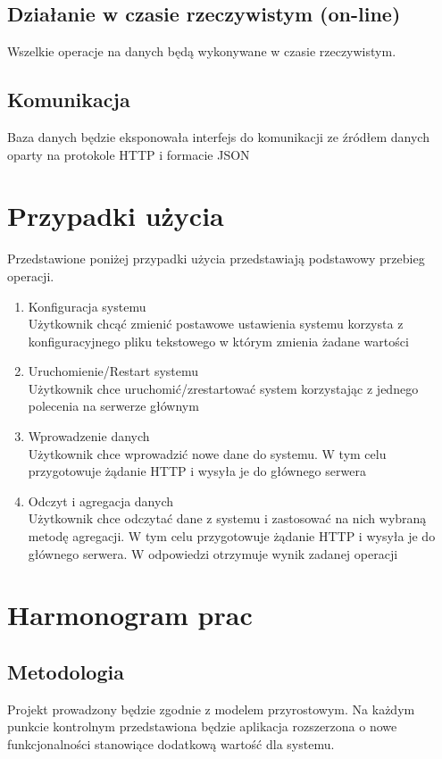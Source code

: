 \documentclass[paper=a4, fontsize=11pt]{scrartcl} %
\numberwithin{equation}{section} %
\numberwithin{figure}{section} %
\numberwithin{table}{section} %
\begin{document}
    \subsection{Działanie w czasie rzeczywistym (on-line)}
    Wszelkie operacje na danych będą wykonywane w czasie rzeczywistym.
    \subsection{Komunikacja}
    Baza danych będzie eksponowała interfejs do komunikacji ze źródłem danych oparty na protokole HTTP i formacie JSON

\section{Przypadki użycia}
    Przedstawione poniżej przypadki użycia przedstawiają podstawowy przebieg operacji.
    \begin{enumerate}
        \item Konfiguracja systemu
        \\Użytkownik chcąć zmienić postawowe ustawienia systemu korzysta z konfiguracyjnego pliku tekstowego w którym
        zmienia żadane wartości
        \item Uruchomienie/Restart systemu
        \\Użytkownik chce uruchomić/zrestartować system korzystając z jednego polecenia na serwerze głównym
        \item Wprowadzenie danych
        \\Użytkownik chce wprowadzić nowe dane do systemu. W tym celu przygotowuje żądanie HTTP i wysyła je do
        głównego serwera
        \item Odczyt i agregacja danych
        \\Użytkownik chce odczytać dane z systemu i zastosować na nich wybraną metodę agregacji. W tym celu przygotowuje
        żądanie HTTP i wysyła je do głównego serwera. W odpowiedzi otrzymuje wynik zadanej operacji

    \end{enumerate}

\section{Harmonogram prac}
    \subsection{Metodologia}
    Projekt prowadzony będzie zgodnie z modelem przyrostowym. Na każdym punkcie kontrolnym przedstawiona będzie
    aplikacja rozszerzona o nowe funkcjonalności stanowiące dodatkową wartość dla systemu.
\end{document}

